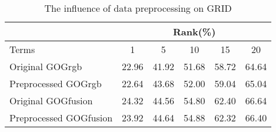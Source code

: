 \label{compMN4}
\begin{table}[H]
\centering
\caption{The influence of data preprocessing on GRID}
\begin{tabular}{|l|c|c|c|c|c|}
\hline
 & \multicolumn{5}{|c|}{Rank(\%)} \\
 \hline
Terms  &1 &5 & 10 &15& 20\\
\hline
Original GOGrgb&22.96& 41.92& 51.68& 58.72& 64.64\\
\hline
Preprocessed GOGrgb &22.64& 43.68& 52.00& 59.04& 65.04\\
\hline
Original GOGfusion &24.32& 44.56& 54.80& 62.40& 66.64\\
\hline
Preprocessed GOGfusion &23.92& 44.64& 54.88& 62.32& 66.40\\
 \hline
 
\end{tabular}
\end{table}
\label{compMN5}

